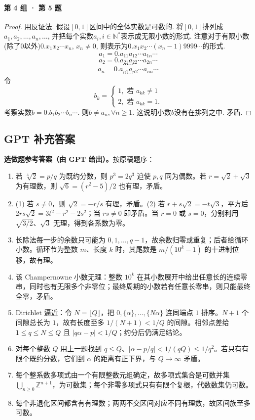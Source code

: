 \documentclass[UTF8,11pt, a4paper, oneside, fontset=none]{ctexbook}
\begin{document}
\paragraph{第 4 组 · 第 5 题}
\begin{proof}

用反证法. 假设$[0, 1]$区间中的全体实数是可数的. 将$[0, 1]$排列成$a_1, a_2, \ldots, a_n, \ldots$, 并把每个实数$a_i, i \in \mathbb N^*$表示成无限小数的形式. 注意对于有限小数(除了0以外)$0.x_1 x_2 \cdots x_n$, $x_n \neq 0$, 则表示为$0.x_1 x_2 \cdots (x_n-1)9999\cdots$的形式.
\[
a_1 = 0. a_{11} a_{12} \cdots a_{1n} \cdots
\]
\[
a_2 = 0. a_{21} a_{22} \cdots a_{2n} \cdots
\]
\[
\cdots \cdots
\]
\[
a_n = 0. a_{n1} a_{n2} \cdots a_{nn} \cdots
\]
\[
\cdots \cdots
\]
令
\[
b_k = \begin{cases}
1, \mbox{ 若 $a_{kk} \neq 1$}\\
2, \mbox{ 若 $a_{kk} = 1$}.
\end{cases}
\]
考察实数$b = 0.b_1 b_2 \cdots b_n \cdots$. 则$b \neq a_n, \forall n \geq 1$. 这说明小数$b$没有在排列之中. 矛盾.

\end{proof}

\clearpage

\subsection*{GPT 补充答案}

\noindent\textbf{选做题参考答案（由 GPT 给出）。}按原稿题序：
\begin{enumerate}
\item 若 $\sqrt[3]2=p/q$ 为既约分数，则 $p^3=2q^3$ 迫使 $p,q$ 同为偶数。若 $r=\sqrt2+\sqrt3$ 为有理数，则 $\sqrt6=(r^2-5)/2$ 也有理，矛盾。
\item (1) 若 $s\ne0$，则 $\sqrt2=-r/s$ 有理，矛盾。(2) 若 $r+s\sqrt2=-t\sqrt3$，平方后 $2rs\sqrt2=3t^2-r^2-2s^2$；当 $rs\ne0$ 即矛盾。当 $r=0$ 或 $s=0$，分别利用 $\sqrt{3/2}$、$\sqrt3$ 无理，得到各系数为零。
\item 长除法每一步的余数只可能为 $0,1,\ldots,q-1$，故余数归零或重复；后者给循环小数。循环节为整数 $m$、长度 $k$ 时，其尾数是 $m/(10^k-1)$ 的十进制位移，故有理。
\item 该 Champernowne 小数无理：整数 $10^k$ 在其小数展开中给出任意长的连续零串，同时也有无限多个非零位；最终周期的小数若有任意长零串，则只能最终全零，矛盾。
\item Dirichlet 逼近：令 $N=\lfloor Q\rfloor$，把 $0,\{\alpha\},\ldots,\{N\alpha\}$ 连同端点 $1$ 排序。$N+1$ 个间隙总长为 $1$，故有长度至多 $1/(N+1)<1/Q$ 的间隙。相邻点差给 $1\le q\le N\le Q$ 且 $|q\alpha-p|<1/Q$；约分后仍满足结论。
\item 对每个整数 $Q$ 用上一题找到 $q\le Q$、$|\alpha-p/q|<1/(qQ)\le1/q^2$。若只有有限个既约分数，它们到 $\alpha$ 的距离有正下界，与 $Q\to\infty$ 矛盾。
\item 每个整系数多项式由一个有限整数元组确定，故多项式集合是可数并集 $\bigcup_{n\ge0}\mathbb Z^{n+1}$，为可数集；每个非零多项式只有有限个复根，代数数集仍可数。
\item 每个非退化区间都含有有理数；两两不交区间对应不同有理数，故区间族至多可数。
\end{enumerate}
\end{document}
